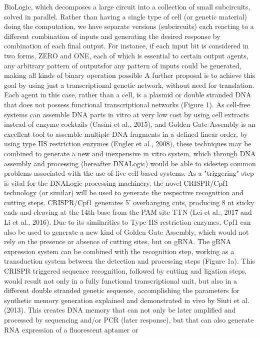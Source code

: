BioLogic, which decomposes a large circuit into a collection of small
subcircuits, solved in parallel. Rather than having a single type of cell (or
genetic material) doing the computation, we have separate versions (subcircuits)
each reacting to a different combination of inputs and generating the desired
response by combination of each final output. For instance, if each input bit is
considered in two forms, ZERO and ONE, each of which is essential to certain
output agents, any arbitrary pattern of outputsfor any pattern of inputs could
be generated, making all kinds of binary operation possible A further proposal
is to achieve this goal by using just a transcriptional genetic network, without
need for translation. Each agent in this case, rather than a cell, is a plasmid
or double stranded DNA that does not possess functional transcriptional networks
(Figure 1). As cell-free systems can assemble DNA parts in vitro at very low
cost by using cell extracts instead of enzyme cocktails (Casini et al., 2015),
and Golden Gate Assembly is an excellent tool to assemble multiple DNA fragments
in a defined linear order, by using type IIS restriction enzymes (Engler et al.,
2008), these techniques may be combined to generate a new and inexpensive in
vitro system, which through DNA assembly and processing (hereafter DNALogic)
would be able to sidestep common problems associated with the use of live cell
based systems. As a "triggering" step is vital for the DNALogic processing
machinery, the novel CRISPR/Cpf1 technology (or similar) will be used to
generate the respective recognition and cutting steps. CRISPR/Cpf1 generates 5'
overhanging cuts, producing 8 nt sticky ends and cleaving at the 14th base from
the PAM site TTN (Lei et al., 2017 and Li et al., 2016). Due to its similarities
to Type IIS restriction enzymes, Cpf1 can also be used to generate a new kind of
Golden Gate Assembly, which would not rely on the presence or absence of cutting
sites, but on gRNA. The gRNA expression system can be combined with the
recognition step, working as a transduction system between the detection and
processing steps (Figure 1a). This CRISPR triggered sequence recognition,
followed by cutting and ligation steps, would result not only in a fully
functional transcriptional unit, but also in a different double stranded genetic
sequence, accomplishing the parameters for synthetic memory generation explained
and demonstrated in vivo by Siuti et al. (2013). This creates DNA memory that
can not only be later amplified and processed by sequencing and/or PCR (later
response), but that can also generate RNA expression of a fluorescent aptamer or
